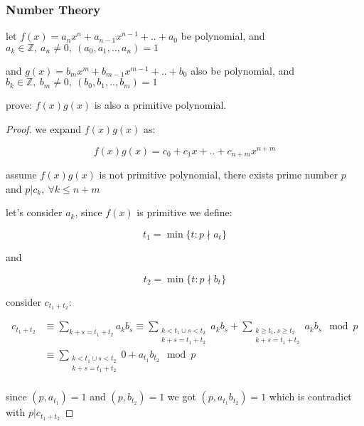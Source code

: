 \subsubsection{Number Theory}


\begin{exercise}
    let $f(x) = a_nx^n + a_{n-1}x^{n-1} + .. + a_0$ be polynomial, and $a_k \in \mathbb{Z},\: a_n \ne 0,\: (a_0,a_1,..,a_n) = 1$

    and $g(x) = b_mx^m + b_{m-1}x^{m-1} + .. + b_0$ also be polynomial, and $b_k \in \mathbb{Z},\: b_m \ne 0,\: (b_0,b_1,..,b_m) = 1$

    prove: $f(x)g(x)$ is also a primitive polynomial.
\end{exercise}

\begin{proof}
    we expand $f(x)g(x)$ as:

    \[
        f(x)g(x) = c_0 + c_1x + .. + c_{n+m}x^{n+m}
    \]

    assume $f(x)g(x)$ is not primitive polynomial, there exists prime number $p$ and $p|c_k,\: \forall k \le n+m$

    let's consider $a_k$, since $f(x)$ is primitive we define:

    \[
        t_1 = \min \{ t: p  \nmid  a_t \}
    \]

    and


    \[
        t_2 = \min \{ t: p  \nmid  b_t \}
    \]

    consider $c_{t_1 + t_2}$:

    \begin{align*}
        c_{t_1+t_2} &\equiv \sum_{k+s = t_1+t_2}a_kb_s \equiv \sum_{\substack{k < t_1 \cup s < t_2 \\ k + s = t_1 + t_2}}a_kb_s + \sum_{\substack{k \ge t_1, s \ge t_2 \\ k+s = t_1+t_2}}a_kb_s \mod p \\ 
        & \equiv \sum_{\substack{k < t_1 \cup s < t_2 \\ k + s = t_1 + t_2}}0 + a_{t_1}b_{t_2} \mod p \\
    \end{align*}

    since $(p, a_{t_1}) = 1$ and $(p, b_{t_2}) = 1$ we got $(p,a_{t_1}b_{t_2}) = 1$ which is contradict with $p | c_{t_1 + t_2}$
\end{proof}